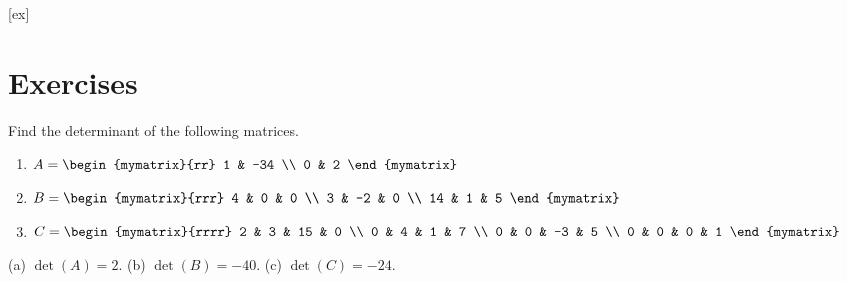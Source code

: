[ex]
\section*{Exercises}


\begin{ex}
  Find the determinant of the following matrices.

  \begin{enumerate}
  \item 
    $A = \begin{mymatrix}{rr}
      1 & -34 \\
      0 & 2 
    \end{mymatrix} $

  \item 
    $B = \begin{mymatrix}{rrr}
      4 & 0 &  0 \\
      3 & -2 & 0 \\
      14 & 1 & 5 
    \end{mymatrix}$

  \item 
    $C = \begin{mymatrix}{rrrr}
      2 & 3 & 15 & 0 \\
      0 & 4 & 1 & 7 \\
      0 & 0 & -3 & 5 \\
      0 & 0 & 0 & 1 
    \end{mymatrix}$
  \end{enumerate}

 \begin{sol}
   (a) $\det(A) = 2$. (b) $\det(B) = -40$. (c) $\det(C) = -24$.
 \end{sol}

\end{ex}

